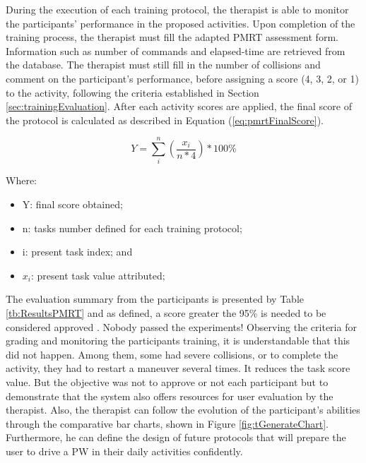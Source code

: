 During the execution of each training protocol, the therapist is able to monitor the participants’ performance in the proposed activities. Upon completion of the training process, the therapist must fill the adapted PMRT assessment form. Information such as number of commands and elapsed-time are retrieved from the database. The therapist must still fill in the number of collisions and comment on the participant’s performance, before assigning a score (4, 3, 2, or 1) to the activity, following the criteria established in Section \ref{sec:trainingEvaluation}. After each activity scores are applied, the final score of the protocol is calculated as described in Equation (\ref{eq:pmrtFinalScore}).   

\begin{equation}\label{eq:pmrtFinalScore}
Y = \sum_{i}^{n}\left (  \frac{x_{i}}{n*4}\right )* 100\%
\end{equation}

Where:
\begin{itemize}
\item Y: final score obtained;
\item n: tasks number defined for each training protocol;
\item i: present task index; and
\item $x_{i}$: present task value attributed;
\end{itemize}

The evaluation summary from the participants is presented by Table \ref{tb:ResultsPMRT} and as defined, a score greater the 95\% is needed to be considered approved \cite{massengale2005}. Nobody passed the experiments! Observing the criteria for grading and monitoring the participants training, it is understandable that this did not happen. Among them, some had severe collisions, or to complete the activity, they had to restart a maneuver several times. It reduces the task score value. But the objective was not to approve or not each participant but to demonstrate that the system also offers resources for user evaluation by the therapist. Also, the therapist can follow the evolution of the participant’s abilities through the comparative bar charts, shown in Figure \ref{fig:tGenerateChart}. Furthermore, he can define the design of future protocols that will prepare the user to drive a PW in their daily activities confidently.

